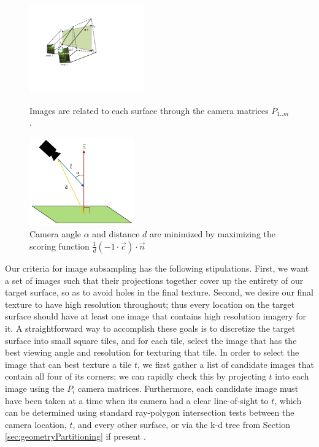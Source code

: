 \documentclass[]{spie}  %
\begin{document}
\begin{figure}
  \begin{minipage}[b]{0.45\linewidth}
    \centering
    \includegraphics[height=1.5in]{Projection.pdf}
    \caption{Images are related to each surface through the camera
      matrices $P_{1..m}$. }
    \label{fig:projection}
  \end{minipage}
  \hspace{0.5cm}
  \begin{minipage}[b]{0.45\linewidth}
    \centering
    \includegraphics[height=1.5in]{scoringFunction.jpg}
    \caption{Camera angle $\alpha$ and distance $d$ are minimized by
      maximizing the scoring function $\frac{1}{d} (-1 \cdot \vec{c})
      \cdot \vec{n}$}
    \label{fig:scoringFunction}
  \end{minipage}
\end{figure}


Our criteria for image subsampling has the following
stipulations. First, we want a set of images such that their
projections together cover up the entirety of our target surface, so
as to avoid holes in the final texture. Second, we desire our final
texture to have high resolution throughout; thus every location on the
target surface should have at least one image that contains high
resolution imagery for it. A straightforward way to accomplish these
goals is to discretize the target surface into small square tiles, and
for each tile, select the image that has the best viewing angle and
resolution for texturing that tile. In order to select the image that
can best texture a tile $t$, we first gather a list of candidate
images that contain all four of its corners; we can rapidly check this
by projecting $t$ into each image using the $P_i$ camera
matrices. Furthermore, each candidate image must have been taken at a
time when its camera had a clear line-of-sight to $t$, which can be
determined using standard ray-polygon intersection tests between the
camera location, $t$, and every other surface, or via the k-d tree
from Section \ref{sec:geometryPartitioning} if present
\cite{rayintersection}.
\end{document}
